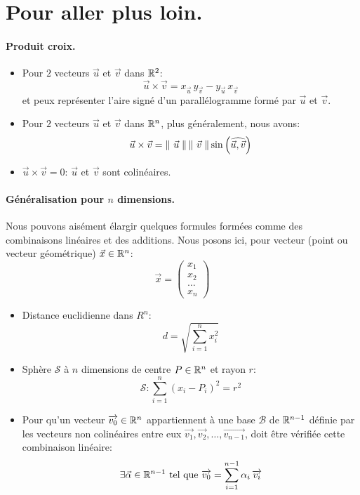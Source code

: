 \documentclass[12pt]{article}
\begin{document}
\section{Pour aller plus loin.}

\paragraph{Produit croix.}
\begin{itemize}
    \item Pour $2$ vecteurs $\vec{u}$ et $\vec{v}$ dans $\mathbb{R}^2$: $$
        \vec{u} \times \vec{v} 
        = x_{\vec{u}} \, y_{\vec{v}} - y_{\vec{u}} \, x_{\vec{v}}
    $$ et peux représenter l'aire signé d'un parallélogramme formé 
    par $\vec{u}$ et $\vec{v}$.

    \item Pour $2$ vecteurs $\vec{u}$ et $\vec{v}$ dans $\mathbb{R}^n$, 
        plus généralement, nous avons: $$
        \vec{u} \times \vec{v} 
        = \left\lVert\ \vec{u}\;\right\rVert \left\lVert\ \vec{v}\;\right\rVert \sin\left({\widehat{\vec{u}, \vec{v}}}\right)
    $$
    \item $\vec{u} \times \vec{v} = 0$: $\vec{u}$ et $\vec{v}$ sont colinéaires.
\end{itemize}

\paragraph{Généralisation pour $n$ dimensions.}
Nous pouvons aisément élargir quelques formules formées
comme des combinaisons linéaires et des additions.
Nous posons ici, pour vecteur (point ou vecteur géométrique) $\vec{x} \in \mathbb{R}^n$: $$
    \vec{x} = \begin{pmatrix}
        x_1 \\ x_2 \\ \dots \\ x_n
    \end{pmatrix}
$$

\begin{itemize}
    \item Distance euclidienne dans $R^n$: $$
        d = \sqrt{\sum_{i=1}^{n}{x_i^2}}
    $$
    \item Sphère $\mathcal{S}$ à $n$ dimensions 
        de centre $P \in \mathbb{R}^n$ et rayon $r$: $$
        \mathcal{S}: \sum_{i=1}^{n}{(x_i - P_i)^2} = r^2
    $$

    \item Pour qu'un vecteur $\overrightarrow{v_0} \in \mathbb{R}^n$ appartiennent à une base $\mathcal{B}$ 
        de $\mathbb{R}^{n - 1}$ définie par les vecteurs non colinéaires entre eux
        $\overrightarrow{v_1}, \overrightarrow{v_2}, \dots, \overrightarrow{v_{n-1}}$,
        doit être vérifiée cette combinaison linéaire: $$
            \exists \vec{\alpha} \in \mathbb{R}^{n-1} \text{ tel que }
            \overrightarrow{v_0} = \sum_{i=1}^{n-1}{\alpha_i \, \overrightarrow{v_i}}
        $$
\end{itemize}  
\end{document}
